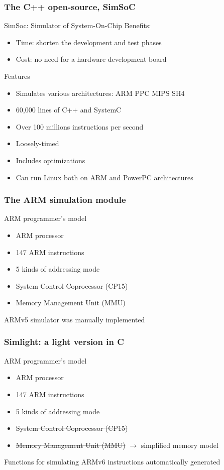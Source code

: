 \documentclass[usenames,dvipsnames]{beamer} %
\begin{document}
\begin{frame}
\frametitle{The C++ open-source, SimSoC}
\begin{block}{SimSoc: Simulator of System-On-Chip}
Benefits:
\begin{itemize}
\item Time: shorten the development and test phases
\item Cost: no need for a hardware development board
\end{itemize}
\end{block}
\begin{block}{Features}
\begin{itemize}
\item Simulates various architectures: ARM PPC MIPS SH4
\item 60,000 lines of C++ and SystemC
\item Over 100 millions instructions per second
\item Loosely-timed
\item Includes optimizations
\item Can run Linux both on ARM and PowerPC architectures
\end{itemize}
\end{block}
\medskip
\large
{}
\end{frame}

\begin{frame}
\frametitle{The ARM simulation module}

\begin{block}{ARM programmer's model}
\begin{itemize}
\item ARM processor
\item 147 ARM instructions
\item 5 kinds of addressing mode
\item System Control Coprocessor (CP15)
\item Memory Management Unit (MMU)
\end{itemize}
\end{block}
\bigskip
ARMv5 simulator was manually implemented
\end{frame}

\begin{frame}
\frametitle{Simlight: a light version in C }
\begin{block}{ARM programmer's model}
\begin{itemize}
\item ARM processor
\item 147 ARM instructions
\item 5 kinds of addressing mode
\item \sout{System Control Coprocessor (CP15)}
\item \sout{Memory Management Unit (MMU)} $\rightarrow$ simplified memory model 
\end{itemize}
\end{block}
\bigskip
Functions for simulating ARMv6 instructions automatically generated
\end{frame}
\end{document}
